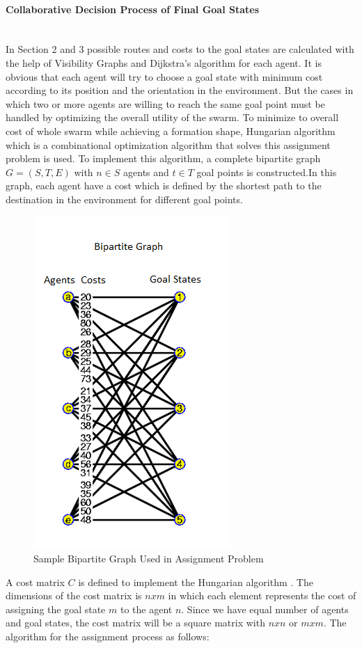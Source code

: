 \paragraph{Collaborative Decision Process of Final Goal States}\hspace{0pt} \\
In Section 2 and 3 possible routes and costs to the goal states are calculated with the help of Visibility Graphs and Dijkstra's algorithm  for each agent. It is obvious that each agent will try to choose a goal state with minimum cost according to its position and the orientation in the environment. But the cases in which two or more agents are willing to reach the same goal point must be handled by optimizing the overall utility of the swarm. To minimize to overall cost of whole swarm while achieving a formation shape, Hungarian algorithm which is a combinational optimization algorithm that solves this assignment problem is used. To implement this algorithm, a complete bipartite graph $G=(S,T,E)$ with $n \in S$ agents and $t \in T$ goal points is constructed.In this graph, each agent have a cost which is defined by the shortest path to the destination in the environment for different goal points. 

\begin{figure}[H]
\centering
\includegraphics[width=.4\textwidth]{bipartite}
\caption{Sample Bipartite Graph Used in Assignment Problem}
\end{figure}

A cost matrix  $C$ is defined to implement the Hungarian algorithm .  The dimensions of the cost matrix is $nxm$ in which each element represents the cost of assigning the goal state $m$ to the agent $n$.  Since we have equal number of agents and goal states, the cost matrix will be a square matrix with $nxn$ or $mxm$.  The algorithm for the assignment process as follows:
	
